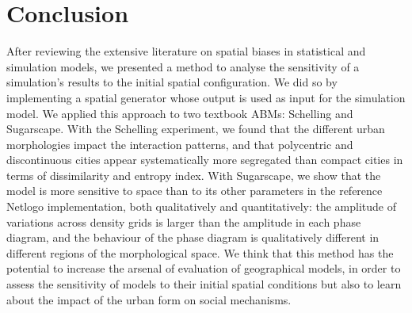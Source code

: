\documentclass{JASSS}
\begin{document}
\section{Conclusion}

After reviewing the extensive literature on spatial biases in statistical and simulation models, we presented a method to analyse the sensitivity of a simulation's results to the initial spatial configuration. We did so by implementing a spatial generator whose output is used as input for the simulation model. We applied this approach to two textbook ABMs: Schelling and Sugarscape. With the Schelling experiment, we found that the different urban morphologies impact the interaction patterns, and that polycentric and discontinuous cities appear systematically more segregated than compact cities in terms of dissimilarity and entropy index. With Sugarscape, we show that the model is more sensitive to space than to its other parameters in the reference Netlogo implementation, both qualitatively and quantitatively: the amplitude of variations across density grids is larger than the amplitude in each phase diagram, and the behaviour of the phase diagram is qualitatively different in different regions of the morphological space. We think that this method has the potential to increase the arsenal of evaluation of geographical models, in order to assess the sensitivity of models to their initial spatial conditions but also to learn about the impact of the urban form on social mechanisms.






\endparano



\end{document}
